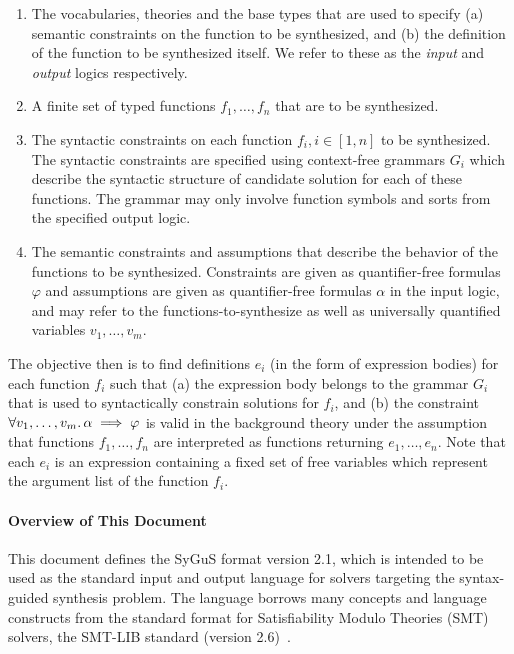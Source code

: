 \documentclass[english,a4paper,10pt]{article}
\begin{document}
\begin{enumerate}
\item
  The vocabularies, theories and the base types that are used to specify
  (a) semantic constraints on the function to be synthesized, and (b) the
  definition of the function to be synthesized itself. We refer to these as
  the \emph{input} and \emph{output} logics respectively.
\item
  A finite set of typed functions $f_1, \ldots, f_n$ that are to be synthesized.
\item
  The syntactic constraints on each function $f_i, i \in [1,n]$ to be
  synthesized. The syntactic constraints are specified using context-free
  grammars $G_i$ which describe the syntactic structure of candidate
  solution for each of these functions.
  The grammar may only involve function
  symbols and sorts from the specified output logic.
\item
  The semantic constraints and assumptions that describe the behavior of the functions to
  be synthesized. Constraints are given as quantifier-free formulas $\varphi$ 
  and assumptions are given as quantifier-free formulas $\alpha$
  in the input logic, and may refer to the functions-to-synthesize as well as 
  universally quantified variables
  $v_1, \ldots, v_m$. 
 
\end{enumerate}
The objective then is to find definitions $e_i$ (in the form of
expression bodies) for each function $f_i$ such that (a) the expression
body belongs to the grammar $G_i$ that is used to syntactically constrain
solutions for $f_i$, and 
(b) the constraint 
$\forall v_1, \ldots,
v_m \ldotp \alpha \implies \varphi$ is valid in the background theory
under the assumption that functions $f_1, \ldots, f_n$
are interpreted as functions returning $e_1, \ldots, e_n$.
Note that each $e_i$ is
an expression containing
a fixed set of free variables which
represent the argument list of the function $f_i$.


\paragraph{Overview of This Document}
This document defines the SyGuS format version 2.1,
which is intended to be used as the standard input and output language
for solvers targeting the syntax-guided synthesis problem.
The language borrows many concepts and language constructs
from the standard format for Satisfiability Modulo Theories (SMT)
solvers, the SMT-LIB standard (version 2.6)~\cite{BarFT-RR-17}.
\end{document}
